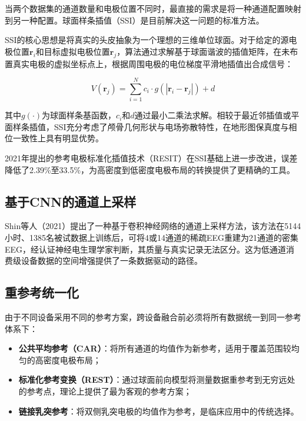 \documentclass[12pt, a4paper]{article}
\begin{document}
当两个数据集的通道数量和电极位置不同时，最直接的需求是将一种通道配置映射到另一种配置。球面样条插值（SSI）是目前解决这一问题的标准方法\citep{Perrin1989spherical}。

SSI的核心思想是将真实的头皮抽象为一个理想的三维单位球面。对于给定的源电极位置$\mathbf{r}_i$和目标虚拟电极位置$\mathbf{r}_j$，算法通过求解基于球面谐波的插值矩阵，在未布置真实电极的虚拟坐标点上，根据周围电极的电位梯度平滑地插值出合成信号：

\begin{equation}
V(\mathbf{r}_j) = \sum_{i=1}^{N} c_i \cdot g(|\mathbf{r}_i - \mathbf{r}_j|) + d
\end{equation}

其中$g(\cdot)$为球面样条基函数，$c_i$和$d$通过最小二乘法求解。相较于最近邻插值或平面样条插值，SSI充分考虑了颅骨几何形状与电场弥散特性，在地形图保真度与相位一致性上具有明显优势\citep{Shin2021CNNupsampling}。

2021年提出的参考电极标准化插值技术（RESIT）在SSI基础上进一步改进，误差降低了2.39\%至33.5\%，为高密度到低密度电极布局的转换提供了更精确的工具\citep{RESIT2021}。

\subsection{基于CNN的通道上采样}

Shin等人（2021）提出了一种基于卷积神经网络的通道上采样方法\citep{Shin2021CNNupsampling}，该方法在5144小时、1385名被试数据上训练后，可将4或14通道的稀疏EEG重建为21通道的密集EEG，经认证神经电生理学家判断，其质量与真实记录无法区分。这为低通道消费级设备数据的空间增强提供了一条数据驱动的路径。

\subsection{重参考统一化}

由于不同设备采用不同的参考方案，跨设备融合前必须将所有数据统一到同一参考体系下：

\begin{itemize}
  \item \textbf{公共平均参考（CAR）}：将所有通道的均值作为新参考，适用于覆盖范围较均匀的高密度电极布局；
  \item \textbf{标准化参考变换（REST）}：通过球面前向模型将测量数据重参考到无穷远处的参考点，理论上提供了最为客观的参考方案；
  \item \textbf{链接乳突参考}：将双侧乳突电极的均值作为参考，是临床应用中的传统选择。
\end{itemize}
\end{document}
